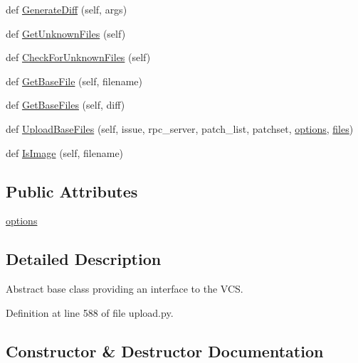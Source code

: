 \begin{DoxyCompactItemize}
\item 
def \hyperlink{classupload_1_1_version_control_system_aa5eb260c96e7016dab36b5fc136c9f49}{Generate\+Diff} (self, args)
\item 
def \hyperlink{classupload_1_1_version_control_system_a56a60e56aa9aff3df4001d2f84cab884}{Get\+Unknown\+Files} (self)
\item 
def \hyperlink{classupload_1_1_version_control_system_ad2923d691a1b1047e9359c5b7c1c103f}{Check\+For\+Unknown\+Files} (self)
\item 
def \hyperlink{classupload_1_1_version_control_system_adfd9d4ecba422102233a2ba13e5bfaf5}{Get\+Base\+File} (self, filename)
\item 
def \hyperlink{classupload_1_1_version_control_system_a812c3b3daf90c88b015fa4b26252e291}{Get\+Base\+Files} (self, diff)
\item 
def \hyperlink{classupload_1_1_version_control_system_a7e334f967301b9e85e5a9c39f5036823}{Upload\+Base\+Files} (self, issue, rpc\+\_\+server, patch\+\_\+list, patchset, \hyperlink{classupload_1_1_version_control_system_a4d57d043bc408887b94269fe4cea9556}{options}, \hyperlink{files_8js_a0742cac2750bccc2d88ac080fb9daa22}{files})
\item 
def \hyperlink{classupload_1_1_version_control_system_a846889ecd2ef40870b456ddb5b349e02}{Is\+Image} (self, filename)
\end{DoxyCompactItemize}
\subsection*{Public Attributes}
\begin{DoxyCompactItemize}
\item 
\hyperlink{classupload_1_1_version_control_system_a4d57d043bc408887b94269fe4cea9556}{options}
\end{DoxyCompactItemize}


\subsection{Detailed Description}
\begin{DoxyVerb}Abstract base class providing an interface to the VCS.\end{DoxyVerb}
 

Definition at line 588 of file upload.\+py.



\subsection{Constructor \& Destructor Documentation}
